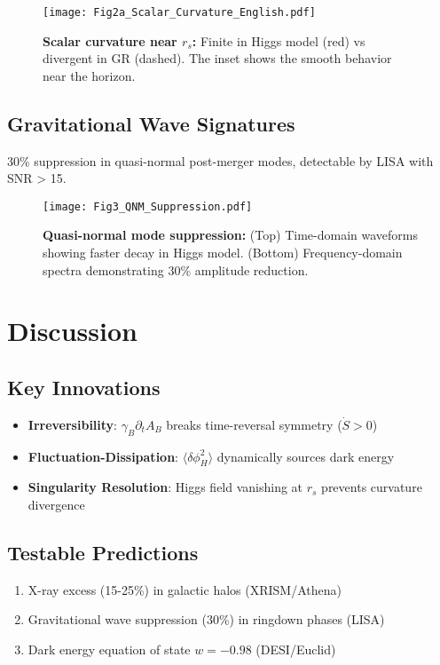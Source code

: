 \documentclass[12pt, a4paper]{article}
\begin{document}
\begin{figure}[htbp]
\centering
\texttt{[image: Fig2a\_Scalar\_Curvature\_English.pdf]}
\caption{\textbf{Scalar curvature near $r_s$:} Finite in Higgs model (red) vs divergent in GR (dashed). The inset shows the smooth behavior near the horizon.}
\label{fig:curvature}
\end{figure}

\subsection{Gravitational Wave Signatures}
30\% suppression in quasi-normal post-merger modes, detectable by LISA with SNR > 15.

\begin{figure}[htbp]
\centering
\texttt{[image: Fig3\_QNM\_Suppression.pdf]}
\caption{\textbf{Quasi-normal mode suppression:} (Top) Time-domain waveforms showing faster decay in Higgs model. (Bottom) Frequency-domain spectra demonstrating 30\% amplitude reduction.}
\label{fig:qnm}
\end{figure}

\section{Discussion}
\subsection{Key Innovations}
\begin{itemize}
\item \textbf{Irreversibility}: $\gamma_B \partial_t A_B$ breaks time-reversal symmetry ($\dot{S} > 0$)
\item \textbf{Fluctuation-Dissipation}: $\langle \delta\phi_H^2 \rangle$ dynamically sources dark energy
\item \textbf{Singularity Resolution}: Higgs field vanishing at $r_s$ prevents curvature divergence
\end{itemize}

\subsection{Testable Predictions}
\begin{enumerate}
\item X-ray excess (15-25\%) in galactic halos (XRISM/Athena)
\item Gravitational wave suppression (30\%) in ringdown phases (LISA)
\item Dark energy equation of state $w = -0.98$ (DESI/Euclid)
\end{enumerate}
\end{document}
